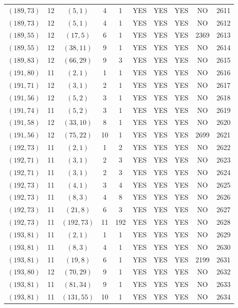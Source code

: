 \begin{longtable}{|c|c|c|c|c|c|c|c|c|c|}
$(189, 73)$ & 12 & $(5, 1)$ & 4 & 1 & YES & YES & YES & NO & 2611\\
$(189, 73)$ & 12 & $(5, 1)$ & 4 & 1 & YES & YES & YES & NO & 2612\\
$(189, 55)$ & 12 & $(17, 5)$ & 6 & 1 & YES & YES & YES & 2369 & 2613\\
$(189, 55)$ & 12 & $(38, 11)$ & 9 & 1 & YES & YES & YES & NO & 2614\\
$(189, 83)$ & 12 & $(66, 29)$ & 9 & 3 & YES & YES & YES & NO & 2615\\
$(191, 80)$ & 11 & $(2, 1)$ & 1 & 1 & YES & YES & YES & NO & 2616\\
$(191, 71)$ & 12 & $(3, 1)$ & 2 & 1 & YES & YES & YES & NO & 2617\\
$(191, 56)$ & 12 & $(5, 2)$ & 3 & 1 & YES & YES & YES & NO & 2618\\
$(191, 74)$ & 11 & $(5, 2)$ & 3 & 1 & YES & YES & YES & NO & 2619\\
$(191, 58)$ & 12 & $(33, 10)$ & 8 & 1 & YES & YES & YES & NO & 2620\\
$(191, 56)$ & 12 & $(75, 22)$ & 10 & 1 & YES & YES & YES & 2699 & 2621\\
$(192, 73)$ & 11 & $(2, 1)$ & 1 & 2 & YES & YES & YES & NO & 2622\\
$(192, 71)$ & 11 & $(3, 1)$ & 2 & 3 & YES & YES & YES & NO & 2623\\
$(192, 71)$ & 11 & $(3, 1)$ & 2 & 3 & YES & YES & YES & NO & 2624\\
$(192, 73)$ & 11 & $(4, 1)$ & 3 & 4 & YES & YES & YES & NO & 2625\\
$(192, 73)$ & 11 & $(8, 3)$ & 4 & 8 & YES & YES & YES & NO & 2626\\
$(192, 73)$ & 11 & $(21, 8)$ & 6 & 3 & YES & YES & YES & NO & 2627\\
$(192, 73)$ & 11 & $(192, 73)$ & 11 & 192 & YES & YES & YES & NO & 2628\\
$(193, 81)$ & 11 & $(2, 1)$ & 1 & 1 & YES & YES & YES & NO & 2629\\
$(193, 81)$ & 11 & $(8, 3)$ & 4 & 1 & YES & YES & YES & NO & 2630\\
$(193, 81)$ & 11 & $(19, 8)$ & 6 & 1 & YES & YES & YES & 2199 & 2631\\
$(193, 80)$ & 12 & $(70, 29)$ & 9 & 1 & YES & YES & YES & NO & 2632\\
$(193, 81)$ & 11 & $(81, 34)$ & 9 & 1 & YES & YES & YES & NO & 2633\\
$(193, 81)$ & 11 & $(131, 55)$ & 10 & 1 & YES & YES & YES & NO & 2634\\

\end{longtable}
